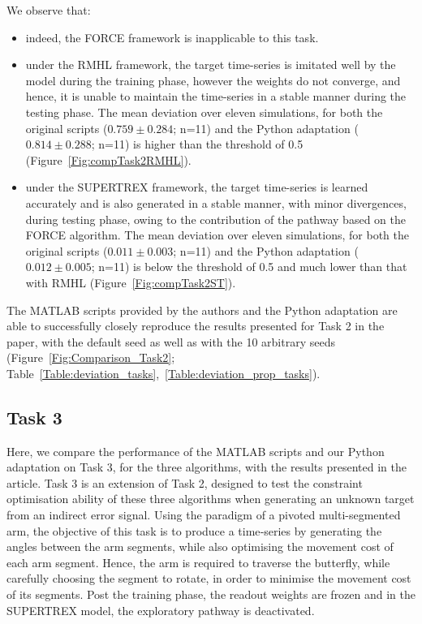 We observe that:
\begin{itemize}
\item indeed, the FORCE framework is inapplicable to this task.  
\item under the RMHL framework, the target time-series is imitated well by the model during the training phase, however the weights do not converge, and hence, it is unable to maintain the time-series in a stable manner during the testing phase. The mean deviation over eleven simulations, for both the original scripts ($0.759\pm0.284$; n=11) and the Python adaptation ($0.814\pm0.288$; n=11) is higher than the threshold of 0.5 (Figure~\ref{Fig:compTask2RMHL}).
\item under the SUPERTREX framework, the target time-series is learned accurately and is also generated in a stable manner, with minor divergences, during testing phase, owing to the contribution of the pathway based on the FORCE algorithm. The mean deviation over eleven simulations, for both the original scripts ($0.011\pm0.003$; n=11) and the Python adaptation ($0.012\pm0.005$; n=11) is below the threshold of 0.5 and much lower than that with RMHL (Figure~\ref{Fig:compTask2ST}).
\end{itemize}

The MATLAB scripts provided by the authors and the Python adaptation are able to successfully closely reproduce the results presented for Task 2 in the paper, with the default seed as well as with the 10 arbitrary seeds (Figure~\ref{Fig:Comparison_Task2}; Table~\ref{Table:deviation_tasks},~\ref{Table:deviation_prop_tasks}).




\subsection{Task 3}
Here, we compare the performance of the MATLAB scripts and our Python adaptation on Task 3, for the three algorithms, with the results presented in the article. Task 3 is an extension of Task 2, designed to test the constraint optimisation ability of these three algorithms when generating an unknown target from an indirect error signal. Using the paradigm of a pivoted multi-segmented arm, the objective of this task is to produce a time‐series by generating the angles between the arm segments, while also optimising the movement cost of each arm segment. Hence, the arm is required to traverse the butterfly, while carefully choosing the segment to rotate, in order to minimise the movement cost of its segments. Post the training phase, the readout weights are frozen and in the SUPERTREX model, the exploratory pathway is deactivated. \\


